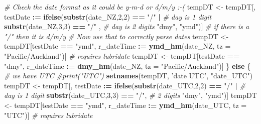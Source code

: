 \documentclass[]{article}
\newenvironment{Shaded}{\begin{snugshade}}{\end{snugshade}}
\newcommand{\KeywordTok}[1]{\textcolor[rgb]{0.13,0.29,0.53}{\textbf{#1}}}
\newcommand{\DataTypeTok}[1]{\textcolor[rgb]{0.13,0.29,0.53}{#1}}
\newcommand{\DecValTok}[1]{\textcolor[rgb]{0.00,0.00,0.81}{#1}}
\newcommand{\StringTok}[1]{\textcolor[rgb]{0.31,0.60,0.02}{#1}}
\newcommand{\CommentTok}[1]{\textcolor[rgb]{0.56,0.35,0.01}{\textit{#1}}}
\newcommand{\ControlFlowTok}[1]{\textcolor[rgb]{0.13,0.29,0.53}{\textbf{#1}}}
\newcommand{\OperatorTok}[1]{\textcolor[rgb]{0.81,0.36,0.00}{\textbf{#1}}}
\newcommand{\ErrorTok}[1]{\textcolor[rgb]{0.64,0.00,0.00}{\textbf{#1}}}
\newcommand{\NormalTok}[1]{#1}
\begin{document}
\begin{Shaded}
\begin{Highlighting}[]
      \CommentTok{# Check the date format as it could be y-m-d or d/m/y :-(}
\NormalTok{      tempDT <-}\StringTok{ }\NormalTok{tempDT[, testDate }\OperatorTok{:}\ErrorTok{=}\StringTok{ }\KeywordTok{ifelse}\NormalTok{(}\KeywordTok{substr}\NormalTok{(date_NZ,}\DecValTok{2}\NormalTok{,}\DecValTok{2}\NormalTok{) }\OperatorTok{==}\StringTok{ "/"} \OperatorTok{|}\StringTok{ }\CommentTok{# day is 1 digit}
\StringTok{                                              }\KeywordTok{substr}\NormalTok{(date_NZ,}\DecValTok{3}\NormalTok{,}\DecValTok{3}\NormalTok{) }\OperatorTok{==}\StringTok{ "/"}\NormalTok{ , }\CommentTok{# day is 2 digits}
                                            \StringTok{"dmy"}\NormalTok{, }\StringTok{"ymd"}\NormalTok{)] }\CommentTok{# if there is a "/" then it is d/m/y}
      \CommentTok{# Now use that to correctly parse dates}
\NormalTok{      tempDT <-}\StringTok{ }\NormalTok{tempDT[testDate }\OperatorTok{==}\StringTok{ "ymd"}\NormalTok{, r_dateTime }\OperatorTok{:}\ErrorTok{=}\StringTok{ }\KeywordTok{ymd_hm}\NormalTok{(date_NZ, }\DataTypeTok{tz =} \StringTok{"Pacific/Auckland"}\NormalTok{)] }\CommentTok{# requires lubridate}
\NormalTok{      tempDT <-}\StringTok{ }\NormalTok{tempDT[testDate }\OperatorTok{==}\StringTok{ "dmy"}\NormalTok{, r_dateTime }\OperatorTok{:}\ErrorTok{=}\StringTok{ }\KeywordTok{dmy_hm}\NormalTok{(date_NZ, }\DataTypeTok{tz =} \StringTok{"Pacific/Auckland"}\NormalTok{)]}
\NormalTok{    \} }\ControlFlowTok{else}\NormalTok{ \{}
      \CommentTok{# we have UTC}
      \CommentTok{#print("UTC")}
      \KeywordTok{setnames}\NormalTok{(tempDT, }\StringTok{'date UTC'}\NormalTok{, }\StringTok{"date_UTC"}\NormalTok{)}
\NormalTok{      tempDT <-}\StringTok{ }\NormalTok{tempDT[, testDate }\OperatorTok{:}\ErrorTok{=}\StringTok{ }\KeywordTok{ifelse}\NormalTok{(}\KeywordTok{substr}\NormalTok{(date_UTC,}\DecValTok{2}\NormalTok{,}\DecValTok{2}\NormalTok{) }\OperatorTok{==}\StringTok{ "/"} \OperatorTok{|}\StringTok{ }\CommentTok{# day is 1 digit}
\StringTok{                                              }\KeywordTok{substr}\NormalTok{(date_UTC,}\DecValTok{3}\NormalTok{,}\DecValTok{3}\NormalTok{) }\OperatorTok{==}\StringTok{ "/"}\NormalTok{, }\CommentTok{# 2 digits}
                                            \StringTok{"dmy"}\NormalTok{, }\StringTok{"ymd"}\NormalTok{)]}
\NormalTok{      tempDT <-}\StringTok{ }\NormalTok{tempDT[testDate }\OperatorTok{==}\StringTok{ "ymd"}\NormalTok{, r_dateTime }\OperatorTok{:}\ErrorTok{=}\StringTok{ }\KeywordTok{ymd_hm}\NormalTok{(date_UTC, }\DataTypeTok{tz =} \StringTok{"UTC"}\NormalTok{)] }\CommentTok{# requires lubridate}

\end{Highlighting}
\end{Shaded}
\end{document}
